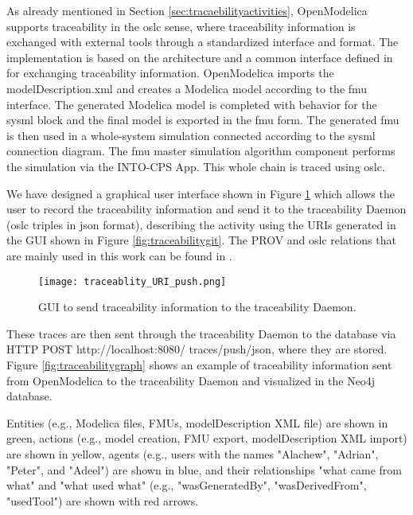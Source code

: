 As already mentioned in Section \ref{sec:tracaebilityactivities}, OpenModelica supports traceability in the \acrshort{oslc} sense, where
traceability information is exchanged with external tools through a standardized interface and format. 
The implementation is based on the architecture and a common interface defined in \cite{intocpskenneth} for  
exchanging traceability information. OpenModelica imports the modelDescription.xml and creates a Modelica model according to the \acrshort{fmu}
interface. The generated Modelica model is completed with behavior for the \acrshort{sysml} block and the final model
is exported in the \acrshort{fmu} form. The generated \acrshort{fmu} is then used in a whole-system simulation connected
according to the \acrshort{sysml} connection diagram. The \acrshort{fmu} master simulation algorithm component performs
the simulation via the INTO-CPS App. This whole chain is traced using \acrshort{oslc}.

We have designed a graphical user interface shown in Figure \ref{fig:traceabilitypush} which allows the user to record the
traceability information and send it to the traceability Daemon (\acrshort{oslc} triples in \acrshort{json} format), describing the activity
using the URIs generated in the GUI shown in Figure  \ref{fig:traceabilitygit}. The PROV and \acrshort{oslc} relations that are mainly used
in this work can be found in \cite{intocpsjohn}.  

\begin{figure} [!h]
	\texttt{[image: traceablity\_URI\_push.png]}
	\caption{GUI to send traceability information to the traceability Daemon.}
	\label{fig:traceabilitypush}
\end{figure}
  
These traces are then sent through the traceability Daemon to the database via HTTP POST http://localhost:8080/
traces/push/json, where they are stored. Figure \ref{fig:traceabilitygraph} shows an example of traceability information 
sent from OpenModelica to the traceability Daemon and visualized in the Neo4j database.

Entities (e.g., Modelica files, FMUs, modelDescription XML file) are shown in green,
actions (e.g., model creation, FMU export, modelDescription XML import) are shown in yellow,
agents (e.g., users with the names {"Alachew"}, {"Adrian"}, {"Peter"}, and {"Adeel")} are shown in blue,
and their relationships "what came from what" and "what used what" (e.g., "wasGeneratedBy", "wasDerivedFrom", "usedTool") are 
shown with red arrows.

